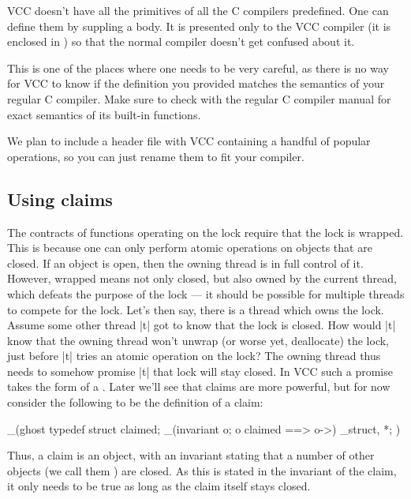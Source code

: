 \begin{note}
VCC doesn't have all the primitives of all the C compilers predefined.
One can define them by suppling a body.
It is presented only to the VCC compiler (it is enclosed in
) so that the normal compiler doesn't get confused
about it.


\noindent
This is one of the places where one needs to be very careful,
as there is no way for VCC to know if the definition you provided matches
the semantics of your regular C compiler.
Make sure to check with the regular C compiler manual for exact semantics
of its built-in functions.

We plan to include a header file with VCC containing a handful of popular operations,
so you can just rename them to fit your compiler. 
\end{note}

\subsection{Using claims}
\label{sect:using-claims}

The contracts of functions operating on the lock require that the lock
is wrapped.
This is because one can only perform atomic operations on objects
that are closed. 
If an object is open, then the owning thread is in full control of it.
However, wrapped means not only closed, but also owned by the current thread,
which defeats the purpose of the lock --- it should be possible
for multiple threads to compete for the lock.
Let's then say, there is a thread which owns the lock.
Assume some other thread \vcc|t| got to know that the lock is closed.
How would \vcc|t| know that the owning thread won't unwrap (or worse yet, deallocate) the lock, just
before \vcc|t| tries an atomic operation on the lock?
The owning thread thus needs to somehow promise \vcc|t|
that lock will stay closed.
In VCC such a promise takes the form of a .
Later we'll see that claims are more powerful, but for
now consider the following to be the definition of a claim:

\begin{VCC}
_(ghost 
typedef struct {
  \ptrset claimed;
  _(invariant \forall \object o; o \in claimed ==> o->\closed)
} \claim_struct, *\claim;
)
\end{VCC}

\noindent
Thus, a claim is an object, with an invariant stating that a number of other objects
(we call them ) are closed.
As this is stated in the invariant of the claim, it only needs to be true
as long as the claim itself stays closed.

